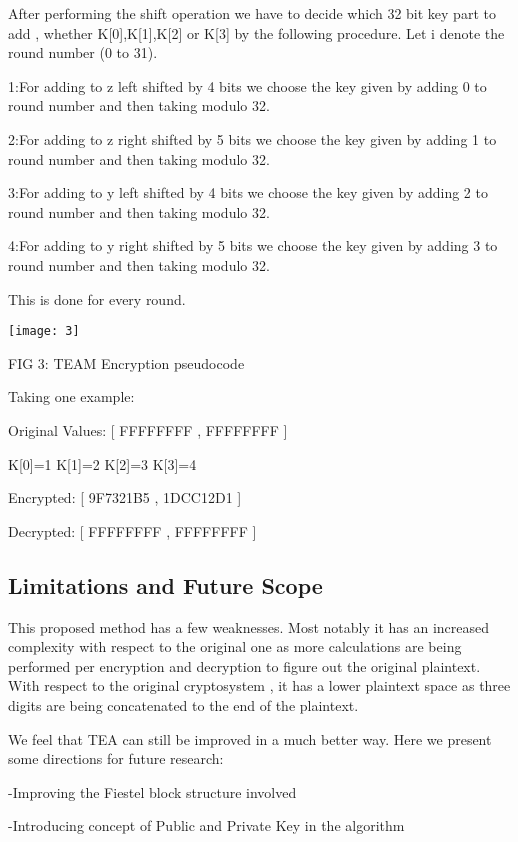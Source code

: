 \documentclass[letterpaper, 12 pt, conference]{ieeeconf}  %
\begin{document}
After performing the shift operation we have to decide which 32 bit key part to add , whether K[0],K[1],K[2] or K[3] by the following procedure. Let i denote the round number (0 to 31).



1:For adding to z left shifted by 4 bits we choose the key given by adding 0 to round number and then taking modulo 32.


2:For adding to z right shifted by 5 bits we choose the key given by adding 1 to round number and then taking modulo 32.


3:For adding to y left shifted by 4 bits we choose the key given by adding 2 to round number and then taking modulo 32.


4:For adding to y right shifted by 5 bits we choose the key given by adding 3 to round number and then taking modulo 32.



This is done for every round.

                          

\texttt{[image: 3]}

FIG 3: TEAM Encryption pseudocode




\newpage     

Taking one example:

Original Values: [ FFFFFFFF , FFFFFFFF ] 

K[0]=1  K[1]=2  K[2]=3  K[3]=4

Encrypted:       [ 9F7321B5 , 1DCC12D1 ]  


Decrypted:       [ FFFFFFFF , FFFFFFFF ]

\subsection{Limitations and Future Scope}
This proposed method has a few weaknesses. Most notably it has an increased complexity with respect to the original one as more calculations are being performed per encryption and decryption to figure out the original plaintext. With respect to the original cryptosystem , it has a lower plaintext space as three digits are being concatenated to the end of the plaintext.

We feel that TEA can still be improved in a much better way. Here we present some directions for future research:


-Improving the Fiestel block structure involved


-Introducing concept of Public and Private Key in the algorithm
\end{document}
